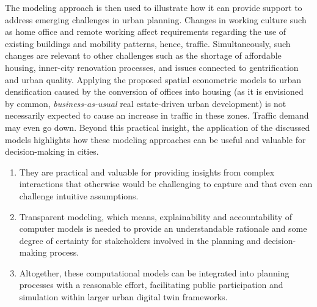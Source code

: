 The modeling approach is then used to illustrate how it can provide support to address emerging challenges in urban planning. Changes in working culture such as home office and remote working affect requirements regarding the use of existing buildings and mobility patterns, hence, traffic. Simultaneously, such changes are relevant to other challenges such as the shortage of affordable housing, inner-city renovation processes, and issues connected to gentrification and urban quality. 
Applying the proposed spatial econometric models to urban densification caused by the conversion of offices into housing (as it is envisioned by common, \emph{business-as-usual} real estate-driven urban development) is not necessarily expected to cause an increase in traffic in these zones. Traffic demand may even go down. Beyond this practical insight, the application of the discussed models highlights how these modeling approaches can be useful and valuable for decision-making in cities. 
\begin{enumerate}
    \item They are practical and valuable for providing insights from complex interactions that otherwise would be challenging to capture and that even can challenge intuitive assumptions. 
    \item Transparent modeling, which means, explainability and accountability of computer models is needed to provide an understandable rationale and some degree of certainty for stakeholders involved in the planning and decision-making process. 
    \item Altogether, these computational models can be integrated into planning processes with a reasonable effort, facilitating public participation and simulation within larger urban digital twin frameworks. 
\end{enumerate}

\FloatBarrier